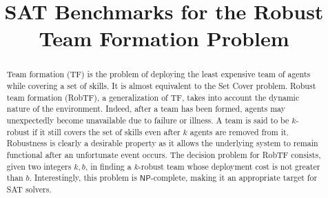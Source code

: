 \documentclass[conference]{IEEEtran}
\theoremstyle{definition}
\begin{document}
\title{SAT Benchmarks for the Robust Team Formation Problem}

\author{
	\and
	\and 
	\and
}


\maketitle

\begin{abstract}
Team formation (TF) is the problem of deploying the least expensive team of agents 
while covering a set of skills. It is almost equivalent to the Set Cover problem.
Robust team formation (RobTF), a generalization of TF,
takes into account the dynamic nature of the environment. Indeed, after 
a team has been formed, agents may unexpectedly become unavailable
due to failure or illness.
A team is said to be $k$-robust if it still covers the set of skills even after $k$ agents are removed from it.
Robustness is clearly a desirable property as it allows the underlying system to remain 
functional after an unfortunate event occurs.
The decision problem for RobTF consists, given two integers $k, b$, in finding a $k$-robust team whose deployment cost is not greater than
$b$. Interestingly, this problem is $\mathsf{NP}$-complete,
making it an appropriate target for SAT solvers.
\end{abstract}
\end{document}
